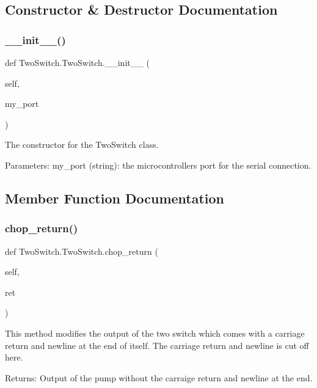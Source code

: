 \subsection{Constructor \& Destructor Documentation}
\mbox{\label{class_two_switch_1_1_two_switch_a762f6622ca527b12104b0593378f87fb}} 
\subsubsection{\texorpdfstring{\_\_init\_\_()}{\_\_init\_\_()}}
{\footnotesize\ttfamily def Two\+Switch.\+Two\+Switch.\+\_\+\+\_\+init\+\_\+\+\_\+ (\begin{DoxyParamCaption}\item[{}]{self,  }\item[{}]{my\+\_\+port }\end{DoxyParamCaption})}

\begin{DoxyVerb}The constructor for the TwoSwitch class.

Parameters:
    my_port (string): the microcontrollers port for the serial connection.
\end{DoxyVerb}
 

\subsection{Member Function Documentation}
\mbox{\label{class_two_switch_1_1_two_switch_a99d8b3d50bedbf126e1fbe10506e501f}} 
\subsubsection{\texorpdfstring{chop\_return()}{chop\_return()}}
{\footnotesize\ttfamily def Two\+Switch.\+Two\+Switch.\+chop\+\_\+return (\begin{DoxyParamCaption}\item[{}]{self,  }\item[{}]{ret }\end{DoxyParamCaption})}

\begin{DoxyVerb}This method modifies the output of the two switch which comes with a carriage return and newline at the end of itself.
The carriage return and newline is cut off here.

Returns:
    Output of the pump without the carraige return and newline at the end.
\end{DoxyVerb}
 \mbox{\label{class_two_switch_1_1_two_switch_ac5eb2e77087de5dc473a0722b16863a5}} 
